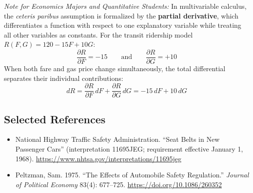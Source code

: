 \documentclass[11pt,letterpaper]{article}
\begin{document}
\begin{tcolorbox}[colback=blue!5!white,colframe=blue!75!black,title=\textbf{Optional Advanced Section: Partial Derivatives as Formal \textit{Ceteris Paribus}}]
\small
\emph{Note for Economics Majors and Quantitative Students:}
In multivariable calculus, the \emph{ceteris paribus} assumption is formalized by the \textbf{partial derivative}, which differentiates a function with respect to one explanatory variable while treating all other variables as constants. For the transit ridership model $R(F, G) = 120 - 15F + 10G$:
\[
\frac{\partial R}{\partial F} = -15 \qquad \text{and} \qquad \frac{\partial R}{\partial G} = +10
\]
When both fare and gas price change simultaneously, the total differential separates their individual contributions:
\[
dR = \frac{\partial R}{\partial F}\,dF + \frac{\partial R}{\partial G}\,dG = -15\,dF + 10\,dG
\]
\end{tcolorbox}

\subsection*{Selected References}
\begin{itemize}
    \item National Highway Traffic Safety Administration. ``Seat Belts in New Passenger Cars'' (interpretation 11695JEG; requirement effective January 1, 1968). \url{https://www.nhtsa.gov/interpretations/11695jeg}
    \item Peltzman, Sam. 1975. ``The Effects of Automobile Safety Regulation.'' \emph{Journal of Political Economy} 83(4): 677--725. \url{https://doi.org/10.1086/260352}
\end{itemize}
\end{document}
